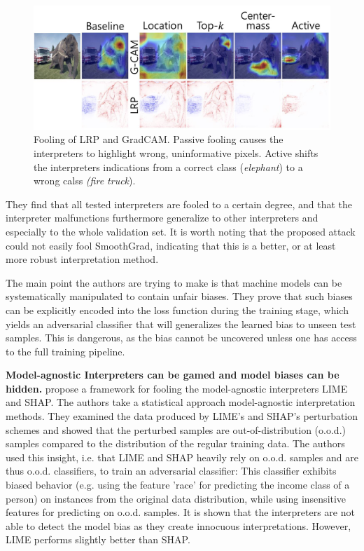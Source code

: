 \documentclass[sigconf]{acmart}
\newcommand{\mypar}[1]{\vspace{0.2cm}\noindent\textbf{#1}}
\begin{document}
\begin{figure}[ht]
    \centering
    \includegraphics[width=\linewidth]{figures/heo_intro.jpg}
    \caption{Fooling of LRP and GradCAM. Passive fooling causes the interpreters to highlight wrong, uninformative pixels. Active shifts the interpreters indications from a correct class (\textit{elephant}) to a wrong calss \textit{(fire truck}).}
    \label{fig:heo_intro}
    \vspace{-0.3cm}
\end{figure}

 They find that all tested interpreters are fooled to a certain degree, and that the interpreter malfunctions furthermore generalize to other interpreters and especially to the whole validation set. It is worth noting that the proposed attack could not easily fool SmoothGrad, indicating that this is a better, or at least more robust interpretation method. 

The main point the authors are trying to make is that machine models can be systematically manipulated to contain unfair biases. They prove that such biases can be explicitly encoded into the loss function during the training stage, which yields an adversarial classifier that will generalizes the learned bias to unseen test samples. This is dangerous, as the bias cannot be uncovered unless one has access to the full training pipeline. 

\mypar{Model-agnostic Interpreters can be gamed and model biases can be hidden.} 
\cite{advlime_aies20} propose a framework for fooling the model-agnostic interpreters LIME and SHAP. 
The authors take a statistical approach model-agnostic interpretation methods. They examined the data produced by LIME's and SHAP's perturbation schemes and showed that the perturbed samples are out-of-distribution (o.o.d.) samples compared to the distribution of the regular training data. The authors used this insight, i.e. that LIME and SHAP heavily rely on o.o.d. samples and are thus o.o.d. classifiers, to train an adversarial classifier: This classifier exhibits biased behavior (e.g. using the feature 'race' for predicting the income class of a person) on instances from the original data distribution, while using insensitive features for predicting on o.o.d. samples. It is shown that the interpreters are not able to detect the model bias as they create innocuous interpretations. However, LIME performs slightly better than SHAP. 
\end{document}

